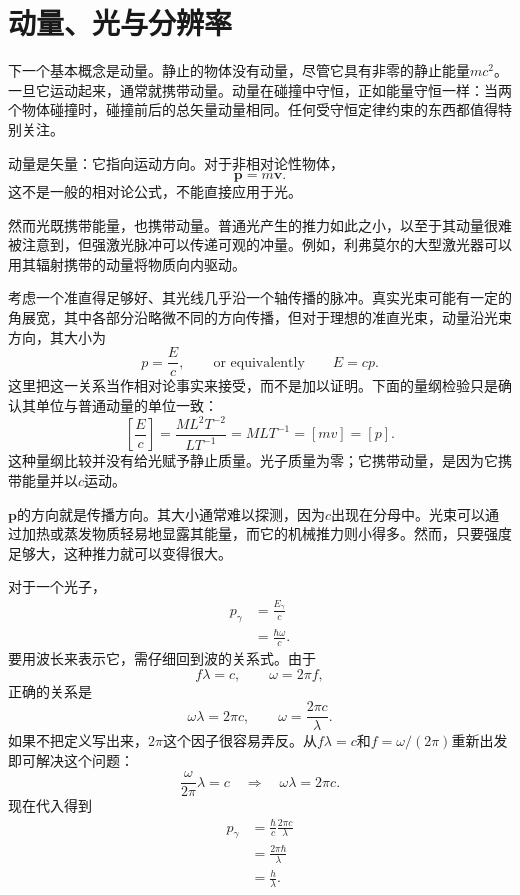 \section{动量、光与分辨率}

下一个基本概念是动量。静止的物体没有动量，尽管它具有非零的静止能量\(mc^2\)。一旦它运动起来，通常就携带动量。动量在碰撞中守恒，正如能量守恒一样：当两个物体碰撞时，碰撞前后的总矢量动量相同。任何受守恒定律约束的东西都值得特别关注。

动量是矢量：它指向运动方向。对于非相对论性物体，
\begin{equation}
\mathbf p=m\mathbf v.
\end{equation}
这不是一般的相对论公式，不能直接应用于光。

然而光既携带能量，也携带动量。普通光产生的推力如此之小，以至于其动量很难被注意到，但强激光脉冲可以传递可观的冲量。例如，利弗莫尔的大型激光器可以用其辐射携带的动量将物质向内驱动。

考虑一个准直得足够好、其光线几乎沿一个轴传播的脉冲。真实光束可能有一定的角展宽，其中各部分沿略微不同的方向传播，但对于理想的准直光束，动量沿光束方向，其大小为
\begin{equation}
p=\frac{E}{c},
\qquad\text{or equivalently}\qquad
E=cp.
\end{equation}
这里把这一关系当作相对论事实来接受，而不是加以证明。下面的量纲检验只是确认其单位与普通动量的单位一致：
\begin{equation}
\left[\frac{E}{c}\right]
=
\frac{M L^2 T^{-2}}{L T^{-1}}
=
M L T^{-1}
=
[m v]
=
[p].
\end{equation}
这种量纲比较并没有给光赋予静止质量。光子质量为零；它携带动量，是因为它携带能量并以\(c\)运动。

\(\mathbf p\)的方向就是传播方向。其大小通常难以探测，因为\(c\)出现在分母中。光束可以通过加热或蒸发物质轻易地显露其能量，而它的机械推力则小得多。然而，只要强度足够大，这种推力就可以变得很大。

对于一个光子，
\begin{align}
p_\gamma
&=\frac{E_\gamma}{c}\\
&=\frac{\hbar\omega}{c}.
\end{align}
要用波长来表示它，需仔细回到波的关系式。由于
\begin{equation}
f\lambda=c,
\qquad
\omega=2\pi f,
\end{equation}
正确的关系是
\begin{equation}
\omega\lambda=2\pi c,
\qquad
\omega=\frac{2\pi c}{\lambda}.
\end{equation}
如果不把定义写出来，\(2\pi\)这个因子很容易弄反。从\(f\lambda=c\)和\(f=\omega/(2\pi)\)重新出发即可解决这个问题：
\begin{equation}
\frac{\omega}{2\pi}\lambda=c
\quad\Longrightarrow\quad
\omega\lambda=2\pi c.
\end{equation}
现在代入得到
\begin{align}
p_\gamma
&=\frac{\hbar}{c}\frac{2\pi c}{\lambda}\\
&=\frac{2\pi\hbar}{\lambda}\\
&=\frac{h}{\lambda}.
\end{align}

